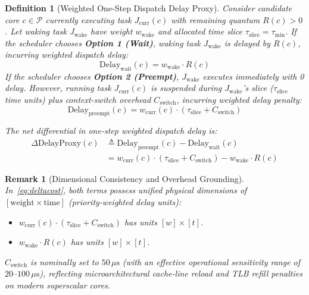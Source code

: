 \documentclass[conference]{IEEEtran}
\newtheorem{definition}{Definition}
\newtheorem{remark}{Remark}
\begin{document}
\begin{definition}[Weighted One-Step Dispatch Delay Proxy]
\label{def:deltacost}
Consider candidate core $c \in \mathcal{P}$ currently executing task $J_{\mathrm{curr}}(c)$ with remaining quantum $R(c) > 0$. Let waking task $J_{\mathrm{wake}}$ have weight $w_{\mathrm{wake}}$ and allocated time slice $\tau_{\mathrm{slice}} = \tau_{\min}$. If the scheduler chooses \textbf{Option 1 (Wait)}, waking task $J_{\mathrm{wake}}$ is delayed by $R(c)$, incurring weighted dispatch delay:
\begin{equation}
\mathrm{Delay}_{\mathrm{wait}}(c) = w_{\mathrm{wake}} \cdot R(c)
\end{equation}
If the scheduler chooses \textbf{Option 2 (Preempt)}, $J_{\mathrm{wake}}$ executes immediately with 0 delay. However, running task $J_{\mathrm{curr}}(c)$ is suspended during $J_{\mathrm{wake}}$'s slice ($\tau_{\mathrm{slice}}$ time units) plus context-switch overhead $C_{\mathrm{switch}}$, incurring weighted delay penalty:
\begin{equation}
\mathrm{Delay}_{\mathrm{preempt}}(c) = w_{\mathrm{curr}}(c) \cdot (\tau_{\mathrm{slice}} + C_{\mathrm{switch}})
\end{equation}

The net differential in one-step weighted dispatch delay is:
\begin{align}
\label{eq:deltacost}
\Delta\mathrm{DelayProxy}(c) &\triangleq \mathrm{Delay}_{\mathrm{preempt}}(c) - \mathrm{Delay}_{\mathrm{wait}}(c) \nonumber \\
&= w_{\mathrm{curr}}(c) \cdot (\tau_{\mathrm{slice}} + C_{\mathrm{switch}}) - w_{\mathrm{wake}} \cdot R(c)
\end{align}
\end{definition}

\begin{remark}[Dimensional Consistency and Overhead Grounding]
In~\eqref{eq:deltacost}, both terms possess unified physical dimensions of $[\mathrm{weight} \times \mathrm{time}]$ (priority-weighted delay units):
\begin{itemize}
    \item $w_{\mathrm{curr}}(c) \cdot (\tau_{\mathrm{slice}} + C_{\mathrm{switch}})$ has units $[w] \times [t]$.
    \item $w_{\mathrm{wake}} \cdot R(c)$ has units $[w] \times [t]$.
\end{itemize}
$C_{\mathrm{switch}}$ is nominally set to $50\,\mu\text{s}$ (with an effective operational sensitivity range of $20\text{--}100\,\mu\text{s}$), reflecting microarchitectural cache-line reload and TLB refill penalties on modern superscalar cores.
\end{remark}
\end{document}
